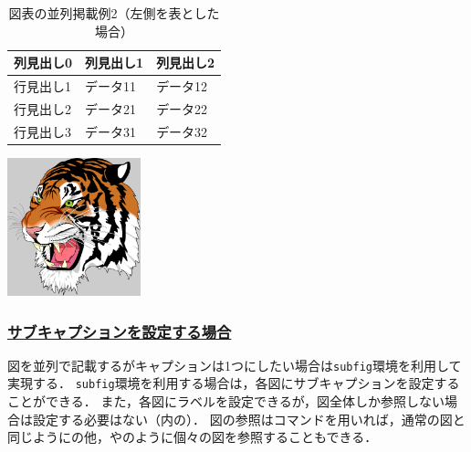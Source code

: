 \documentclass[a4j,11pt]{ujreport}
\begin{document}
\begin{description}
\begin{table}[ht]
	\centering
	\begin{minipage}[]{0.5\hsize}
		\centering 
		\caption{図表の並列掲載例2（左側を表とした場合）}
		\label{tab:ExampleParallelMixLeft2}
		\small
		\begin{tabular}{l|ll}
			\Hline 
			列見出し0 & 列見出し1 & 列見出し2\\ 
			\hline\hline
			行見出し1 & データ11 & データ12\\
			行見出し2 & データ21 & データ22\\
			行見出し3 & データ31 & データ32\\
			\hline 
		\end{tabular}
	\end{minipage}%
	\begin{minipage}[]{0.5\hsize}
		\centering
		\includegraphics[clip,height=4.0cm]{fig/tiger.eps}
		\label{fig:ExampleParallelMixRight2}
	\end{minipage}
\end{table}

\end{description}

\subsubsection{\underline{サブキャプションを設定する場合}}
図を並列で記載するがキャプションは1つにしたい場合は\texttt{subfig}環境を利用して実現する．
\texttt{subfig}環境を利用する場合は，各図にサブキャプションを設定することができる．
また，各図にラベルを設定できるが，図全体しか参照しない場合は設定する必要はない（内の）．
図の参照はコマンドを用いれば，通常の図と同じようにの他，やのように個々の図を参照することもできる．
\end{document}
